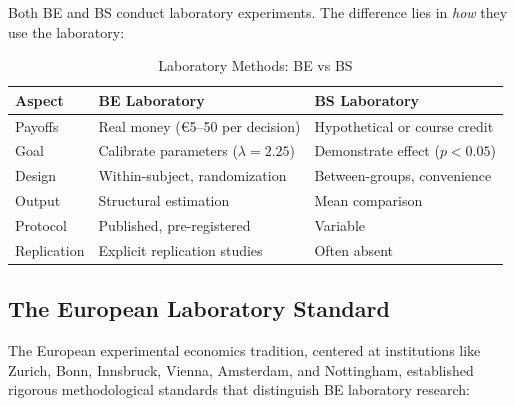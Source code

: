 \documentclass[11pt, a4paper]{article}
\begin{document}
Both BE and BS conduct laboratory experiments. The difference lies in \textit{how} they use the laboratory:

\begin{table}[htbp]
\centering
\caption{Laboratory Methods: BE vs BS}
\label{tab:evd-lab-comparison}
\renewcommand{\arraystretch}{1.3}
\begin{tabular}{@{}p{3.5cm}p{5cm}p{5cm}@{}}
\toprule
\textbf{Aspect} & \textbf{BE Laboratory} & \textbf{BS Laboratory} \\
\midrule
Payoffs & Real money (€5--50 per decision) & Hypothetical or course credit \\
Goal & Calibrate parameters ($\lambda = 2.25$) & Demonstrate effect ($p < 0.05$) \\
Design & Within-subject, randomization & Between-groups, convenience \\
Output & Structural estimation & Mean comparison \\
Protocol & Published, pre-registered & Variable \\
Replication & Explicit replication studies & Often absent \\
\bottomrule
\end{tabular}
\end{table}

\subsection{The European Laboratory Standard}

The European experimental economics tradition, centered at institutions like Zurich, Bonn, Innsbruck, Vienna, Amsterdam, and Nottingham, established rigorous methodological standards that distinguish BE laboratory research:
\end{document}
